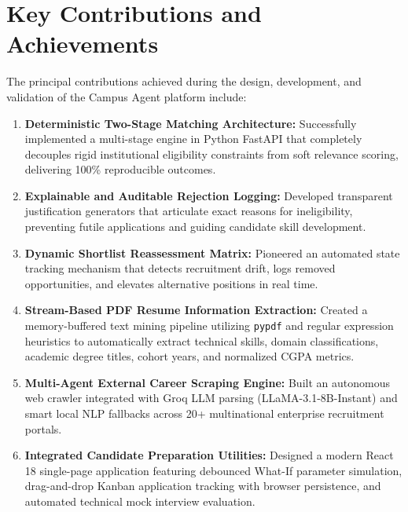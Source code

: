 \section{Key Contributions and Achievements} \label{S7.2}
The principal contributions achieved during the design, development, and validation of the Campus Agent platform include:
\begin{enumerate}[label=\textbf{\arabic*.}]
	\item \textbf{Deterministic Two-Stage Matching Architecture:} Successfully implemented a multi-stage engine in Python FastAPI that completely decouples rigid institutional eligibility constraints from soft relevance scoring, delivering 100\% reproducible outcomes.
	\item \textbf{Explainable and Auditable Rejection Logging:} Developed transparent justification generators that articulate exact reasons for ineligibility, preventing futile applications and guiding candidate skill development.
	\item \textbf{Dynamic Shortlist Reassessment Matrix:} Pioneered an automated state tracking mechanism that detects recruitment drift, logs removed opportunities, and elevates alternative positions in real time.
	\item \textbf{Stream-Based PDF Resume Information Extraction:} Created a memory-buffered text mining pipeline utilizing \texttt{pypdf} and regular expression heuristics to automatically extract technical skills, domain classifications, academic degree titles, cohort years, and normalized CGPA metrics.
	\item \textbf{Multi-Agent External Career Scraping Engine:} Built an autonomous web crawler integrated with Groq LLM parsing (LLaMA-3.1-8B-Instant) and smart local NLP fallbacks across 20+ multinational enterprise recruitment portals.
	\item \textbf{Integrated Candidate Preparation Utilities:} Designed a modern React 18 single-page application featuring debounced What-If parameter simulation, drag-and-drop Kanban application tracking with browser persistence, and automated technical mock interview evaluation.
\end{enumerate}

